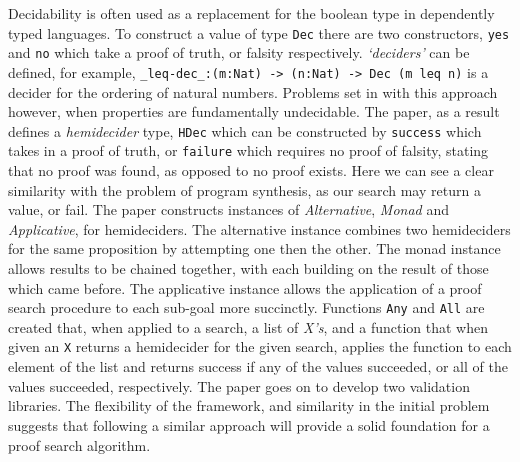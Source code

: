 \documentclass[a4paper]{article}
\begin{document}
Decidability is often used as a replacement for the boolean type in dependently typed languages. To construct a value of type 
\texttt{Dec} there are two constructors, \texttt{yes} and \texttt{no} which take a proof of truth, or falsity respectively. \emph{`deciders'} can be defined, 
for example, \texttt{\_leq-dec\_:(m:Nat) -> (n:Nat) -> Dec (m leq n)} is a decider for the ordering of natural numbers.
Problems set in with this approach however, when properties are fundamentally undecidable. The paper, as a result defines
a \emph{hemidecider} type, \texttt{HDec} which can be constructed by \texttt{success} which takes in a proof of truth, or \texttt{failure} which
requires no proof of falsity, stating that no proof was found, as opposed to no proof exists. 
Here we can see a clear similarity with the problem of program synthesis, as our search may return a value, or fail.
The paper constructs instances of \emph{Alternative}, \emph{Monad} and \emph{Applicative}, for hemideciders. The alternative instance combines
two hemideciders for the same proposition by attempting one then the other. The monad instance allows results to be 
chained together, with each building on the result of those which came before. The applicative instance allows the application
of a proof search procedure to each sub-goal more succinctly. Functions \texttt{Any} and \texttt{All} are created that, when applied to a 
search, a list of \emph{X's}, and a function that when given an \texttt{X} returns a hemidecider for the given search, applies the 
function to each element of the list and returns success if any of the values succeeded, or all of the values succeeded, respectively. 
The paper goes on to develop two validation libraries. The flexibility of the framework, and similarity in the initial problem 
suggests that following a similar approach will provide a solid foundation for a proof search algorithm.
\end{document}
